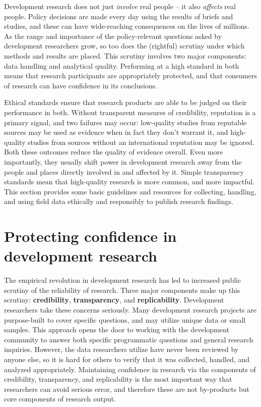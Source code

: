 
\begin{fullwidth}
Development research does not just \textit{involve} real people -- it also \textit{affects} real people.
Policy decisions are made every day using the results of briefs and studies,
and these can have wide-reaching consequences on the lives of millions.
As the range and importance of the policy-relevant questions
asked by development researchers grow,
so too does the (rightful) scrutiny under which methods and results are placed.
This scrutiny involves two major components: data handling and analytical quality.
Performing at a high standard in both means that research participants
are appropriately protected,
and that consumers of research can have confidence in its conclusions.

Ethical standards ensure that research products are able to be judged on their performance in both.
Without transparent measures of credibility, reputation is a primary signal, and two failures may occur:
low-quality studies from reputable sources may be used as evidence when in fact they don't warrant it,
and high-quality studies from sources without an international reputation may be ignored.
Both these outcomes reduce the quality of evidence overall.
Even more importantly, they usually shift power in development research
away from the people and places directly involved in and affected by it.
Simple transparency standards mean that high-quality research is more common, and more impactful.
This section provides some basic guidelines and resources
for collecting, handling, and using field data ethically and responsibly to publish research findings.
\end{fullwidth}


\section{Protecting confidence in development research}

The empirical revolution in development research
has led to increased public scrutiny of the reliability of research.\cite{rogers_2017}
Three major components make up this scrutiny: \textbf{credibility},\cite{ioannidis2017power} \textbf{transparency},\cite{christensen2018transparency} and \textbf{replicability}.\cite{duvendack2017meant}
Development researchers take these concerns seriously.
Many development research projects are purpose-built to cover specific questions,
and may utilize unique data or small samples.
This approach opens the door to working with the development community
to answer both specific programmatic questions and general research inquiries.
However, the data researchers utilize have never been reviewed by anyone else,
so it is hard for others to verify that it was collected, handled, and analyzed appropriately.
Maintaining confidence in research via the components of credibility, transparency, and replicability
is the most important way that researchers can avoid serious error,
and therefore these are not by-products but core components of research output.

